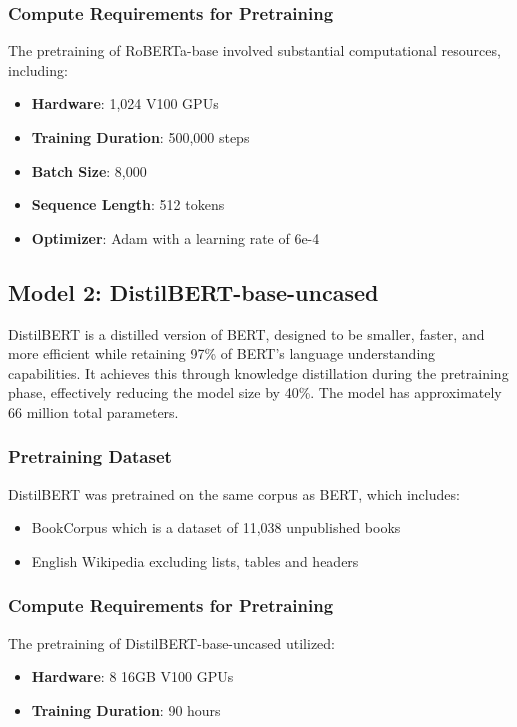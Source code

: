 \documentclass[titlepage]{article}
\begin{document}
\subsubsection{Compute Requirements for Pretraining}
The pretraining of RoBERTa-base involved substantial computational resources, including:
\begin{itemize}
    \item \textbf{Hardware}: 1,024 V100 GPUs
    \item \textbf{Training Duration}: 500,000 steps 
    \item \textbf{Batch Size}: 8,000
    \item \textbf{Sequence Length}: 512 tokens
    \item \textbf{Optimizer}: Adam with a learning rate of 6e-4 
\end{itemize}

\subsection{Model 2: DistilBERT-base-uncased}
DistilBERT is a distilled version of BERT, designed to be smaller, faster, and more efficient while retaining 97\% of BERT's language 
understanding capabilities. It achieves this through knowledge distillation during the pretraining phase, effectively reducing the model 
size by 40\%. The model has approximately 66 million total parameters.

\subsubsection{Pretraining Dataset}
DistilBERT was pretrained on the same corpus as BERT, which includes:
\begin{itemize}
    \item BookCorpus which is a dataset of 11,038 unpublished books
    \item English Wikipedia excluding lists, tables and headers
\end{itemize}

\subsubsection{Compute Requirements for Pretraining}
The pretraining of DistilBERT-base-uncased utilized:
\begin{itemize}
    \item \textbf{Hardware}: 8 16GB V100 GPUs
    \item \textbf{Training Duration}: 90 hours
\end{itemize}
\end{document}

